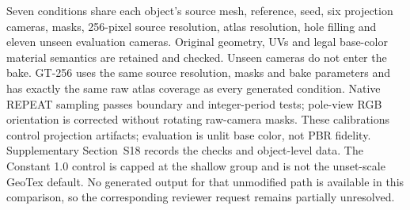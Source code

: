 \documentclass[times,twocolumn,final]{elsarticle}
\providecommand{\DIFadd}[1]{{\protect\color{blue} \sf #1}} %
\begin{document}
\DIFadd{Seven conditions share each object's source mesh, reference, seed, six projection cameras, masks, 256-pixel source resolution, atlas resolution, hole filling and eleven unseen evaluation cameras. Original geometry, UVs and legal base-color material semantics are retained and checked. Unseen cameras do not enter the bake. GT-256 uses the same source resolution, masks and bake parameters and has exactly the same raw atlas coverage as every generated condition. Native REPEAT sampling passes boundary and integer-period tests; pole-view RGB orientation is corrected without rotating raw-camera masks. These calibrations control projection artifacts; evaluation is unlit base color, not PBR fidelity. Supplementary Section~S18 records the checks and object-level data. The Constant 1.0 control is capped at the shallow group and is not the unset-scale GeoTex default. No generated output for that unmodified path is available in this comparison, so the corresponding reviewer request remains partially unresolved.
}
\end{document}
